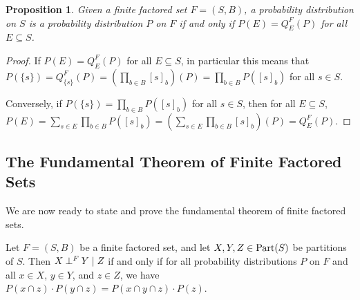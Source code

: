 \documentclass[authordate,onecolumn]{miri-tech-article}
\newtheorem{proposition}{Proposition}
\begin{document}
\begin{proposition}
Given a finite factored set $F=(S,B)$, a probability distribution on $S$ is a probability distribution $P$ on $F$ if and only if $P(E)=Q^F_E(P)$ for all $E\subseteq S$.
\end{proposition}
\begin{proof}
If $P(E)=Q^F_E(P)$ for all $E\subseteq S$, in particular this means that $P(\{s\})=Q^F_{\{s\}}(P)=(\prod_{b\in B}[s]_b)(P)=\prod_{b\in B}P([s]_b)$ for all $s\in S$.

Conversely, if $P(\{s\})=\prod_{b\in B}P([s]_b)$ for all $s\in S$, then for all $E\subseteq S$,  $P(E)=\sum_{s\in E} \prod_{b\in B}P([s]_b)=(\sum_{s\in E} \prod_{b\in B}[s]_b)(P)=Q^F_E(P)$.
\end{proof}
\subsection{The Fundamental Theorem of Finite Factored Sets}
We are now ready to state and prove the fundamental theorem of finite factored sets.
\begin{theorem}\label{ft}
Let $F=(S,B)$ be a finite factored set, and let $X,Y,Z\in \text{Part}(S)$ be partitions of $S$. Then $X\mathbin{\perp^{F}}Y\mid Z$ if and only if for all probability distributions $P$ on $F$ and all $x\in X$, $y\in Y$, and $z\in Z$, we have $P(x\cap z)\cdot P(y\cap z)= P(x\cap y\cap z)\cdot P(z)$.
\end{theorem}
\end{document}
